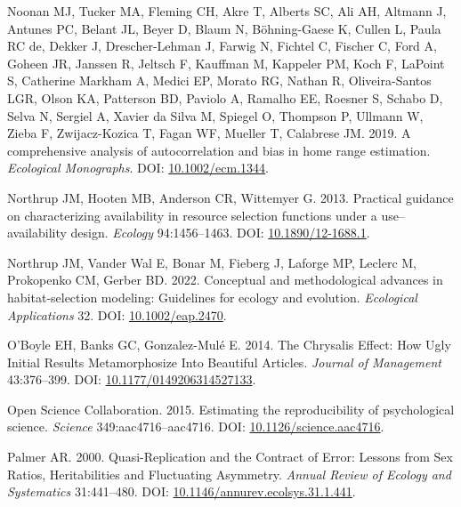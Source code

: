 \documentclass[10pt,a4paper]{article}
\newlength{\cslhangindent}
\newenvironment{CSLReferences}[2] %
 {\begin{list}{}{%
  \setlength{\itemindent}{0pt}
  \setlength{\leftmargin}{0pt}
  \setlength{\parsep}{0pt}
  \ifodd #1
   \setlength{\leftmargin}{\cslhangindent}
   \setlength{\itemindent}{-1\cslhangindent}
  \fi
  \setlength{\itemsep}{#2\baselineskip}}}
 {\end{list}}
\begin{document}
\begin{CSLReferences}{1}{0}
Noonan MJ, Tucker MA, Fleming CH, Akre T, Alberts SC, Ali AH, Altmann J, Antunes PC, Belant JL, Beyer D, Blaum N, Böhning-Gaese K, Cullen L, Paula RC de, Dekker J, Drescher-Lehman J, Farwig N, Fichtel C, Fischer C, Ford A, Goheen JR, Janssen R, Jeltsch F, Kauffman M, Kappeler PM, Koch F, LaPoint S, Catherine Markham A, Medici EP, Morato RG, Nathan R, Oliveira-Santos LGR, Olson KA, Patterson BD, Paviolo A, Ramalho EE, Roesner S, Schabo D, Selva N, Sergiel A, Xavier da Silva M, Spiegel O, Thompson P, Ullmann W, Zieba F, Zwijacz-Kozica T, Fagan WF, Mueller T, Calabrese JM. 2019. A comprehensive analysis of autocorrelation and bias in home range estimation. \emph{Ecological Monographs}. DOI: \href{https://doi.org/10.1002/ecm.1344}{10.1002/ecm.1344}.

Northrup JM, Hooten MB, Anderson CR, Wittemyer G. 2013. Practical guidance on characterizing availability in resource selection functions under a use--availability design. \emph{Ecology} 94:1456--1463. DOI: \href{https://doi.org/10.1890/12-1688.1}{10.1890/12-1688.1}.

Northrup JM, Vander Wal E, Bonar M, Fieberg J, Laforge MP, Leclerc M, Prokopenko CM, Gerber BD. 2022. Conceptual and methodological advances in habitat‐selection modeling: Guidelines for ecology and evolution. \emph{Ecological Applications} 32. DOI: \href{https://doi.org/10.1002/eap.2470}{10.1002/eap.2470}.

O'Boyle EH, Banks GC, Gonzalez-Mulé E. 2014. The {Chrysalis} {Effect}: {How} {Ugly} {Initial} {Results} {Metamorphosize} {Into} {Beautiful} {Articles}. \emph{Journal of Management} 43:376--399. DOI: \href{https://doi.org/10.1177/0149206314527133}{10.1177/0149206314527133}.

Open Science Collaboration. 2015. Estimating the reproducibility of psychological science. \emph{Science} 349:aac4716--aac4716. DOI: \href{https://doi.org/10.1126/science.aac4716}{10.1126/science.aac4716}.

Palmer AR. 2000. Quasi-{Replication} and the {Contract} of {Error}: {Lessons} from {Sex} {Ratios}, {Heritabilities} and {Fluctuating} {Asymmetry}. \emph{Annual Review of Ecology and Systematics} 31:441--480. DOI: \href{https://doi.org/10.1146/annurev.ecolsys.31.1.441}{10.1146/annurev.ecolsys.31.1.441}.


\end{CSLReferences}
\end{document}
